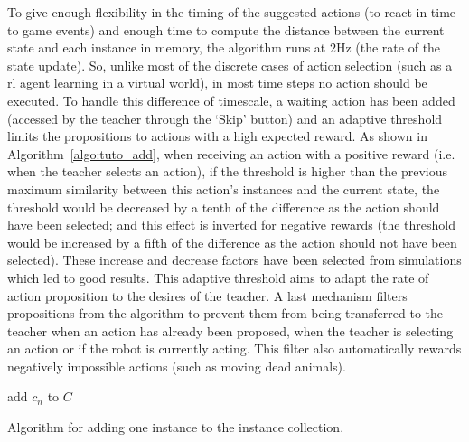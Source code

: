 To give enough flexibility in the timing of the suggested actions (to react in time to game events) and enough time to compute the distance between the current state and each instance in memory, the algorithm runs at 2Hz (the rate of the state update). So, unlike most of the discrete cases of action selection (such as a \gls{rl} agent learning in a virtual world), in most time steps no action should be executed. To handle this difference of timescale, a waiting action has been added (accessed by the teacher through the `Skip' button) and an adaptive threshold limits the propositions to actions with a high expected reward. As shown in Algorithm~\ref{algo:tuto_add}, when receiving an action with a positive reward (i.e. when the teacher selects an action), if the threshold is higher than the previous maximum similarity between this action's instances and the current state, the threshold would be decreased by a tenth of the difference as the action should have been selected; and this effect is inverted for negative rewards (the threshold would be increased by a fifth of the difference as the action should not have been selected). These increase and decrease factors have been selected from simulations which led to good results. This adaptive threshold aims to adapt the rate of action proposition to the desires of the teacher. A last mechanism filters propositions from the algorithm to prevent them from being transferred to the teacher when an action has already been proposed, when the teacher is selecting an action or if the robot is currently acting. This filter also automatically rewards negatively impossible actions (such as moving dead animals).

\begin{algorithm}
	\DontPrintSemicolon
	add	$c_n$ to $C$
	\caption{Algorithm for adding one instance to the instance collection.}
	\label{algo:tuto_add}
\end{algorithm}

